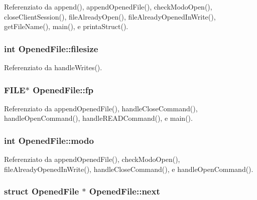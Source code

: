Referenziato da append(), append\+Opened\+File(), check\+Modo\+Open(), close\+Client\+Session(), file\+Already\+Open(), file\+Already\+Opened\+In\+Write(), get\+File\+Name(), main(), e printa\+Struct().

\hypertarget{structOpenedFile_a3b2e157f5aad06b65bd017d67fde4eb3}{
\subsubsection[{filesize}]{\setlength{\rightskip}{0pt plus 5cm}int Opened\+File\+::filesize}}\label{structOpenedFile_a3b2e157f5aad06b65bd017d67fde4eb3}


Referenziato da handle\+Writes().

\hypertarget{structOpenedFile_a9cdcaccacb2eb66a17c0781666c28b15}{
\subsubsection[{fp}]{\setlength{\rightskip}{0pt plus 5cm}F\+I\+L\+E$\ast$ Opened\+File\+::fp}}\label{structOpenedFile_a9cdcaccacb2eb66a17c0781666c28b15}


Referenziato da append\+Opened\+File(), handle\+Close\+Command(), handle\+Open\+Command(), handle\+R\+E\+A\+D\+Command(), e main().

\hypertarget{structOpenedFile_a6d9f22ff6ba81506ba9c4a60f27c4f32}{
\subsubsection[{modo}]{\setlength{\rightskip}{0pt plus 5cm}int Opened\+File\+::modo}}\label{structOpenedFile_a6d9f22ff6ba81506ba9c4a60f27c4f32}


Referenziato da append\+Opened\+File(), check\+Modo\+Open(), file\+Already\+Opened\+In\+Write(), handle\+Close\+Command(), e handle\+Open\+Command().

\hypertarget{structOpenedFile_a9b8c8b995cdda6da249a6ce9a9df98b2}{
\subsubsection[{next}]{\setlength{\rightskip}{0pt plus 5cm}struct {\bf Opened\+File} $\ast$ Opened\+File\+::next}}\label{structOpenedFile_a9b8c8b995cdda6da249a6ce9a9df98b2}


